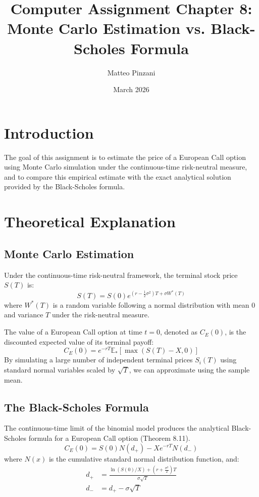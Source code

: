 \documentclass{article}
\title{Computer Assignment Chapter 8: \\ Monte Carlo Estimation vs. Black-Scholes Formula}
\author{Matteo Pinzani}
\date{March 2026}
\begin{document}
\maketitle

\section{Introduction}
The goal of this assignment is to estimate the price of a European Call option using Monte Carlo simulation under the continuous-time risk-neutral measure, and to compare this empirical estimate with the exact analytical solution provided by the Black-Scholes formula.

\section{Theoretical Explanation}

\subsection{Monte Carlo Estimation}
Under the continuous-time risk-neutral framework, the terminal stock price $S(T)$ is:
\begin{equation}
    S(T) = S(0) e^{(r - \frac{1}{2}\sigma^2)T + \sigma W^*(T)}
\end{equation}
where $W^*(T)$ is a random variable following a normal distribution with mean $0$ and variance $T$ under the risk-neutral measure.

The value of a European Call option at time $t=0$, denoted as $C_E(0)$, is the discounted expected value of its terminal payoff:
\begin{equation}
    C_E(0) = e^{-rT} \mathbb{E}_*[\max(S(T) - X, 0)]
\end{equation}
By simulating a large number of independent terminal prices $S_i(T)$ using standard normal variables scaled by $\sqrt{T}$, we can approximate using the sample mean.

\subsection{The Black-Scholes Formula}
The continuous-time limit of the binomial model produces the analytical Black-Scholes formula for a European Call option (Theorem 8.11).
\begin{equation}
    C_E(0) = S(0)N(d_+) - X e^{-rT}N(d_-)
\end{equation}
where $N(x)$ is the cumulative standard normal distribution function, and:
\begin{align*}
    d_+ &= \frac{\ln(S(0)/X) + (r + \frac{\sigma^2}{2})T}{\sigma \sqrt{T}} \\
    d_- &= d_+ - \sigma \sqrt{T}
\end{align*}
\end{document}
